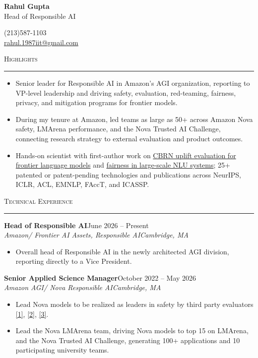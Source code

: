 \documentclass[11pt]{article}
\newcommand{\sectionheading}[1]{%
  \vspace{8pt}%
  {\large\scshape #1}\par\vspace{1pt}\hrule\vspace{3pt}%
}
\newcommand{\resumeentry}[5]{%
  \textbf{#1}\hfill #2\\
  \textit{#3}\hfill \textit{#4}
  \begin{itemize}
    #5
  \end{itemize}
  \vspace{2pt}
}
\newcommand{\socialicons}{%
  \href{https://www.linkedin.com/in/rahul-gupta-16139818}{\textcolor[HTML]{0077B5}{\Large\faLinkedin}}%
  \hspace{0.55em}%
  \href{https://scholar.google.com/citations?user=gSTLsFcAAAAJ}{\textcolor[HTML]{4285F4}{\Large\aiGoogleScholarSquare}}%
}
\begin{document}
\begin{center}
  {\LARGE\bfseries Rahul Gupta}\\[4pt]
  {\large Head of Responsible AI}
\end{center}

\vspace{12pt}

\begin{minipage}[t]{0.48\textwidth}
  (213)587-1103\\
  \href{mailto:rahul.1987iit@gmail.com}{rahul.1987iit@gmail.com}
\end{minipage}
\hfill
\begin{minipage}[t]{0.48\textwidth}
  \raggedleft
  \socialicons
\end{minipage}

\sectionheading{Highlights}
\begin{itemize}
  \item Senior leader for Responsible AI in Amazon's AGI organization, reporting to VP-level leadership and driving safety, evaluation, red-teaming, fairness, privacy, and mitigation programs for frontier models.
  \item During my tenure at Amazon, led teams as large as 50+ across Amazon Nova safety, LMArena performance, and the Nova Trusted AI Challenge, connecting research strategy to external evaluation and product outcomes.
  \item Hands-on scientist with first-author work on \href{https://arxiv.org/abs/2607.12200}{CBRN uplift evaluation for frontier language models} and \href{https://dl.acm.org/doi/abs/10.1145/3539597.3575785}{fairness in large-scale NLU systems}; 25+ patented or patent-pending technologies and publications across NeurIPS, ICLR, ACL, EMNLP, FAccT, and ICASSP.
\end{itemize}

\sectionheading{Technical Experience}

\resumeentry
  {Head of Responsible AI}
  {June 2026 -- Present}
  {Amazon/ Frontier AI Assets, Responsible AI}
  {Cambridge, MA}
  {\item Overall head of Responsible AI in the newly architected AGI division, reporting directly to a Vice President.}

\resumeentry
  {Senior Applied Science Manager}
  {October 2022 -- May 2026}
  {Amazon AGI/ Nova Responsible AI}
  {Cambridge, MA}
  {\item Lead Nova models to be realized as leaders in safety by third party evaluators \href{https://www.openpr.com/news/3785920/anthropic-amazon-lead-the-way-in-ai-safety-for-frontier-models}{[1]}, \href{https://medium.com/aymara-ai/the-aymara-llm-risk-responsibility-matrix-5a243fcf7e38}{[2]}, \href{https://www.amazon.science/blog/independent-evaluations-demonstrate-nova-premiers-safety}{[3]}.
   \item Lead the Nova LMArena team, driving Nova models to top 15 on LMArena, and the Nova Trusted AI Challenge, generating 100+ applications and 10 participating university teams.}
\end{document}
